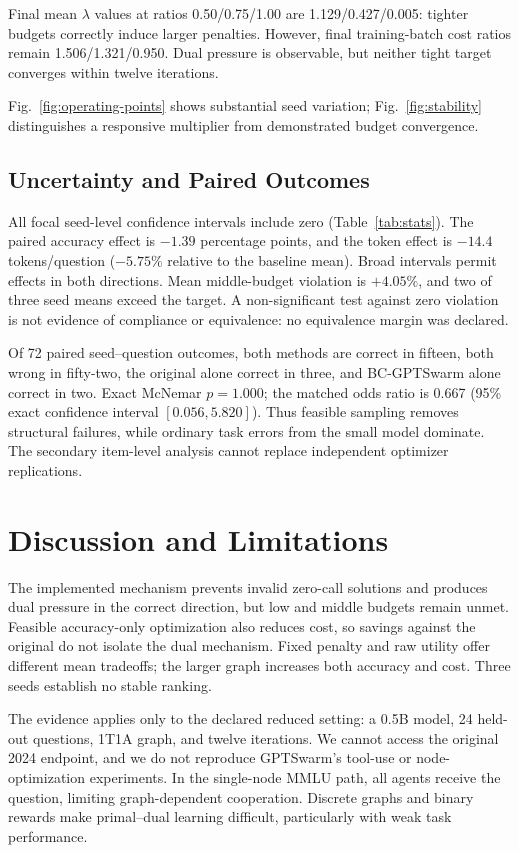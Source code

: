 \documentclass[journal]{IEEEtran}
\begin{document}
Final mean $\lambda$ values at ratios 0.50/0.75/1.00 are 1.129/0.427/0.005: tighter budgets correctly induce larger penalties. However, final training-batch cost ratios remain 1.506/1.321/0.950. Dual pressure is observable, but neither tight target converges within twelve iterations.



Fig.~\ref{fig:operating-points} shows substantial seed variation; Fig.~\ref{fig:stability} distinguishes a responsive multiplier from demonstrated budget convergence.

\subsection{Uncertainty and Paired Outcomes}

All focal seed-level confidence intervals include zero (Table~\ref{tab:stats}). The paired accuracy effect is $-1.39$ percentage points, and the token effect is $-14.4$ tokens/question ($-5.75\%$ relative to the baseline mean). Broad intervals permit effects in both directions. Mean middle-budget violation is $+4.05\%$, and two of three seed means exceed the target. A non-significant test against zero violation is not evidence of compliance or equivalence: no equivalence margin was declared.

Of 72 paired seed--question outcomes, both methods are correct in fifteen, both wrong in fifty-two, the original alone correct in three, and BC-GPTSwarm alone correct in two. Exact McNemar $p=1.000$; the matched odds ratio is 0.667 (95\% exact confidence interval $[0.056,5.820]$). Thus feasible sampling removes structural failures, while ordinary task errors from the small model dominate. The secondary item-level analysis cannot replace independent optimizer replications.

\section{Discussion and Limitations}
The implemented mechanism prevents invalid zero-call solutions and produces dual pressure in the correct direction, but low and middle budgets remain unmet. Feasible accuracy-only optimization also reduces cost, so savings against the original do not isolate the dual mechanism. Fixed penalty and raw utility offer different mean tradeoffs; the larger graph increases both accuracy and cost. Three seeds establish no stable ranking.

The evidence applies only to the declared reduced setting: a 0.5B model, 24 held-out questions, 1T1A graph, and twelve iterations. We cannot access the original 2024 endpoint, and we do not reproduce GPTSwarm's tool-use or node-optimization experiments. In the single-node MMLU path, all agents receive the question, limiting graph-dependent cooperation. Discrete graphs and binary rewards make primal--dual learning difficult, particularly with weak task performance.
\end{document}
